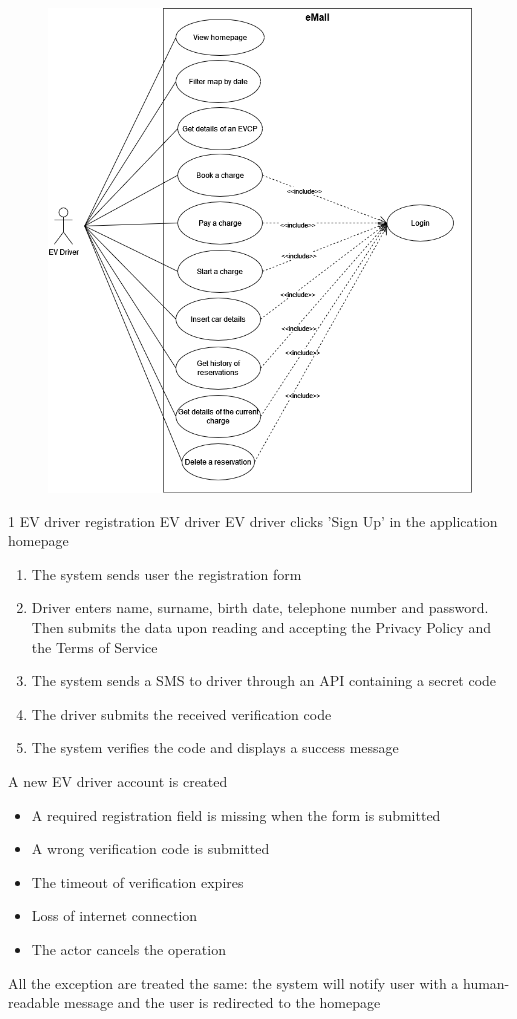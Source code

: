 \begin{figure}[H]
    \centering
    \includegraphics[scale=0.6]{src/use_case_diagram/driver.png}
\end{figure}


\usecase
{1}
{EV driver registration}
{EV driver}
{EV driver clicks 'Sign Up' in the application homepage}
{
    \begin{enumerate}
        \item The system sends user the registration form
        \item Driver enters name, surname, birth date, telephone number and password. Then submits the data upon reading and accepting the Privacy Policy and the Terms of Service
        \item The system sends a SMS to driver through an API containing a secret code
        \item The driver submits the received verification code
        \item The system verifies the code and displays a success message
    \end{enumerate}
}
{A new EV driver account is created}
{
    \begin{itemize}
        \item A required registration field is missing when the form is submitted
        \item A wrong verification code is submitted
        \item The timeout of verification expires
        \item Loss of internet connection
        \item The actor cancels the operation
    \end{itemize}
}
{
    All the exception are treated the same: the system will notify user with a human-readable message and the user is redirected to the homepage
}


